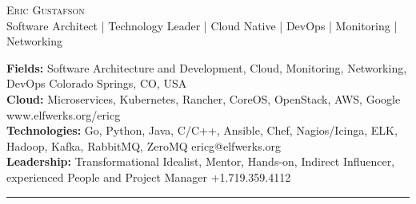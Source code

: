 \documentclass[10pt]{article}
\newcommand{\metasection}[2]
{
\footnotesize{#2} \hspace*{\fill} \footnotesize{#1}\\[1pt]
}
\begin{document}
\pagestyle{fancy}








\vspace{-8pt}
\begin{center}
	\HUGE \textsc{Eric Gustafson}
          \\[4pt]
	\small Software Architect | Technology Leader | Cloud Native | DevOps | Monitoring | Networking
\end{center}



\vspace{6pt}


\metasection{Colorado Springs, CO, USA}
            {\textbf{Fields:} Software Architecture and Development,
              Cloud, Monitoring, Networking, DevOps}
\metasection{www.elfwerks.org/ericg}
            {\textbf{Cloud:} Microservices, Kubernetes, Rancher,
              CoreOS, OpenStack, AWS, Google}
\metasection{ericg@elfwerks.org}
            {\textbf{Technologies:} Go, Python, Java, C/C++, Ansible,
              Chef, Nagios/Icinga, ELK, Hadoop, Kafka, RabbitMQ, ZeroMQ}
\metasection{+1.719.359.4112}
            {\textbf{Leadership:} Transformational Idealist, Mentor,
              Hands-on, Indirect Influencer, experienced People and
              Project Manager}
\vspace{-2pt}
\textcolor{softcol}{\hrule}
\vspace{6pt}
\end{document}
